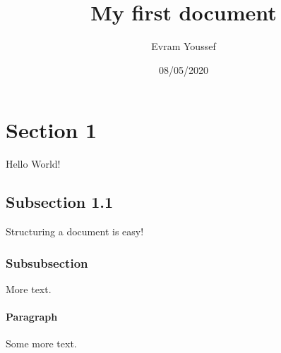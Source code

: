 \documentclass{article}
\title{My first document}
\date{08/05/2020}
\author{Evram Youssef}
\begin{document}
    \maketitle
    \newpage

    \tableofcontents
    \listoffigures
    \listoftables
    \newpage


    \section{Section 1}
    Hello World!

    \subsection{Subsection 1.1}
    Structuring a document is easy!

    \subsubsection{Subsubsection}
    More text.

    \paragraph{Paragraph}
    Some more text.
\end{document}
